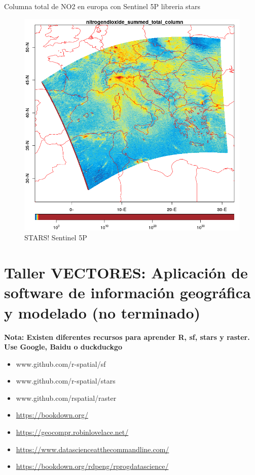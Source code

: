 \documentclass[]{book}
\providecommand{\tightlist}{%
  \setlength{\itemsep}{0pt}\setlength{\parskip}{0pt}}
\begin{document}
Columna total de NO2 en europa con Sentinel 5P libreria stars \citep{stars}

\begin{figure}
\includegraphics[width=1.5\linewidth]{figs/sentinel} \caption{STARS! Sentinel 5P}\label{fig:unnamed-chunk-31}
\end{figure}

\hypertarget{taller-vectores-aplicacion-de-software-de-informacion-geografica-y-modelado-no-terminado}{%
\chapter{Taller VECTORES: Aplicación de software de información geográfica y modelado (no terminado)}\label{taller-vectores-aplicacion-de-software-de-informacion-geografica-y-modelado-no-terminado}}

\textbf{Nota: Existen diferentes recursos para aprender R, sf, stars y raster. Use Google, Baidu o duckduckgo}

\begin{itemize}
\tightlist
\item
  www.github.com/r-spatial/sf
\item
  www.github.com/r-spatial/stars
\item
  www.github.com/rspatial/raster
\item
  \url{https://bookdown.org/}
\item
  \url{https://geocompr.robinlovelace.net/}
\item
  \url{https://www.datascienceatthecommandline.com/}
\item
  \url{https://bookdown.org/rdpeng/rprogdatascience/}
\end{itemize}
\end{document}
